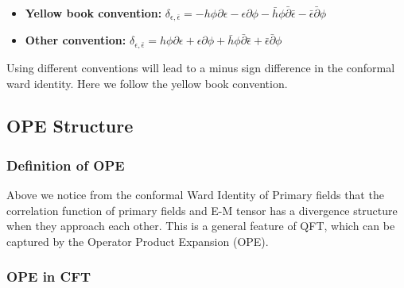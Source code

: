 \begin{itemize}
  \item \textbf{Yellow book convention: } $ \delta_{\epsilon,\bar{\epsilon}} = - h\phi\partial\epsilon - \epsilon\partial\phi - \bar{h}\phi\bar{\partial}\bar{\epsilon} - \bar{\epsilon}\bar{\partial}\phi $
  \item \textbf{Other convention: } $ \delta_{\epsilon,\bar{\epsilon}} =  h\phi\partial\epsilon + \epsilon\partial\phi + \bar{h}\phi\bar{\partial}\bar{\epsilon} + \bar{\epsilon}\bar{\partial}\phi $
\end{itemize}
Using different conventions will lead to a minus sign difference in the conformal ward identity. Here we follow the yellow book convention.


\subsection{OPE Structure}

\subsubsection{Definition of OPE}

Above we notice from the conformal Ward Identity of Primary fields that the correlation function of primary fields and E-M tensor has a divergence structure when they approach each other. This is a general feature of QFT, which can be captured by the Operator Product Expansion (OPE). 



\subsubsection{OPE in CFT}

